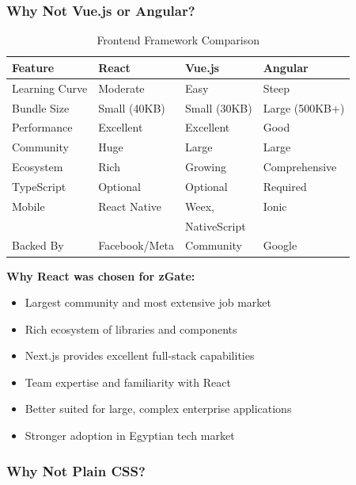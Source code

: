 \subsubsection{Why Not Vue.js or Angular?}

\begin{table}[H]
\centering
\small
\begin{tabular}{|l|l|l|l|}
\hline

\textbf{Feature} & \textbf{React} & \textbf{Vue.js} & \textbf{Angular} \\
\hline
Learning Curve & Moderate & Easy & Steep \\
\hline
Bundle Size & Small (40KB) & Small (30KB) & Large (500KB+) \\
\hline
Performance & Excellent & Excellent & Good \\
\hline
Community & Huge & Large & Large \\
\hline
Ecosystem & Rich & Growing & Comprehensive \\
\hline
TypeScript & Optional & Optional & Required \\
\hline
Mobile & React Native & Weex, & Ionic \\
 & & NativeScript & \\
\hline
Backed By & Facebook/Meta & Community & Google \\
\hline
\end{tabular}
\caption{Frontend Framework Comparison}
\end{table}

\textbf{Why React was chosen for zGate:}
\begin{itemize}
    \item Largest community and most extensive job market
    \item Rich ecosystem of libraries and components
    \item Next.js provides excellent full-stack capabilities
    \item Team expertise and familiarity with React
    \item Better suited for large, complex enterprise applications
    \item Stronger adoption in Egyptian tech market
\end{itemize}

\subsubsection{Why Not Plain CSS?}

